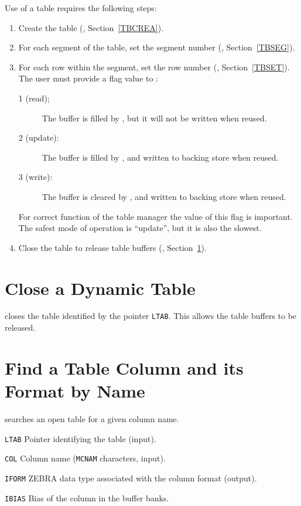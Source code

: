 \clearpage
Use of a table requires the following steps:
\begin{enumerate}
\item Create the table (, Section~\ref{TBCREA}).
\item For each segment of the table, set the segment number
(, Section~\ref{TBSEG}).
\item For each row within the segment, set the row number
(, Section~\ref{TBSET}).
The user must provide a flag value to :
\begin{description}
\item[1 (read);] The buffer is filled by ,
  but it will not be written when reused.
\item[2 (update):] The buffer is filled by ,
  and written to backing store when reused.
\item[3 (write):] The buffer is cleared by ,
  and written to backing store when reused.
\end{description}
For correct function of the table manager the value of this flag is
important.
The safest mode of operation is ``update'',
but it is also the slowest.
\item Close the table to release table buffers
(, Section~\ref{TBCLOS}).
\end{enumerate}

\section{Close a Dynamic Table}
\label{TBCLOS}
closes the table identified by the pointer {\tt LTAB}.
This allows the table buffers to be released.

\section{Find a Table Column and its Format by Name}
\label{TBCOL}
searches an open table for a given column name.
\begin{mylist}
\item[\tt LTAB]
Pointer identifying the table (input).
\item[\tt COL]
Column name ({\tt MCNAM} characters, input).
\item[\tt IFORM]
ZEBRA data type associated with the column format (output).
\item[\tt IBIAS]
Bias of the column in the buffer banks.
\end{mylist}

